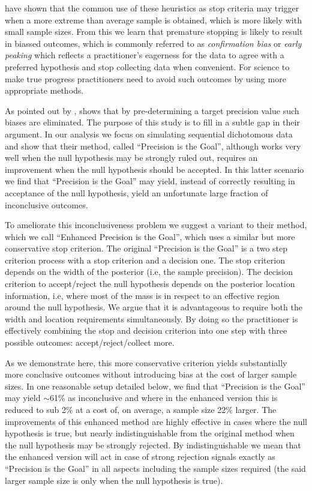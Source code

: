 \cite{kruschke2015doing} have shown that the common use of these heuristics as stop criteria may
trigger when a more extreme than average sample is obtained, which is more likely with
small sample sizes. From this we learn that premature stopping is likely to result in
biassed outcomes, which is commonly referred to as {\it confirmation bias} or
{\it early peaking} which reflects a practitioner’s eagerness for the data to agree with a
preferred hypothesis and stop collecting data when convenient. For science to make true
progress practitioners need to avoid such outcomes by using more appropriate methods.

As pointed out by \cite{maxwell1984}, \cite{kruschke2015doing} shows that by
pre-determining a target precision value such biases are eliminated. The purpose of this
study is to fill in a subtle gap in their argument.
In our analysis we focus on simulating sequential dichotomous data and show that their
method, called “Precision is the Goal”, although works very well when the null
hypothesis may be strongly ruled out, requires an improvement when the null hypothesis
should be accepted. In this latter scenario we find that “Precision is the Goal” may
yield, instead of correctly resulting in acceptance of the null hypothesis,
yield an unfortunate large fraction of inconclusive outcomes.

To ameliorate this inconclusiveness problem we suggest a variant to their method,
which we call “Enhanced Precision is the Goal”, which uses a similar but more
conservative stop criterion. The original “Precision is the Goal” is a two step
criterion process with a stop criterion and a decision one.
The stop criterion depends
on the width of the posterior (i.e, the sample precision). The decision criterion to
accept/reject the null hypothesis depends on the posterior location information, i.e,
where most of the mass is in respect to an effective region around the null hypothesis.
We argue that it is advantageous to require both the width and location requirements
simultaneously. By doing so the practitioner is effectively combining the stop and
decision criterion into one step with three possible outcomes: accept/reject/collect
more. 

As we demonstrate here, this more conservative criterion yields substantially more
conclusive outcomes without introducing bias at the cost of larger sample sizes.
In one reasonable setup detailed below, we find that “Precision is the Goal” may yield
$\sim$61\% as inconclusive and where in the enhanced version this is  reduced to sub 2\%
at a cost of, on average, a sample size 22\% larger.
The improvements of this enhanced method are highly effective in cases where the null
hypothesis is true, but nearly indistinguishable from the original method when the null
hypothesis may be strongly rejected. By indistinguishable we mean that the enhanced
version will act in case of strong rejection signals exactly as “Precision is the Goal”
in all aspects including the sample sizes required (the said larger sample size is only
when the null hypothesis is true).
